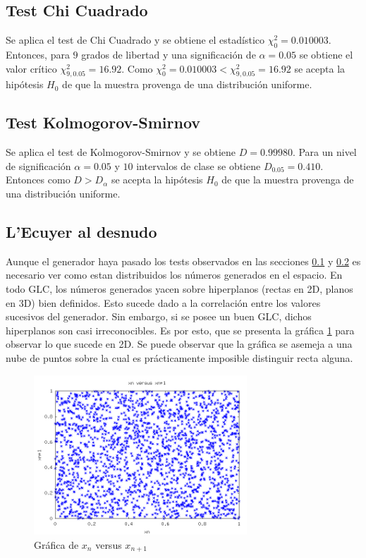 \documentclass{sig-alternate}
\begin{document}
\subsection{Test Chi Cuadrado}
\label{sec:chi}
Se aplica el test de Chi Cuadrado y se obtiene el estad\'istico $\chi_{0}^{2}=0.010003$.
Entonces, para $9$ grados de libertad y una significaci\'on de $\alpha=0.05$ se obtiene
el valor cr\'itico $\chi_{9,0.05}^{2}=16.92$.
Como $\chi_{0}^{2}=0.010003 < \chi_{9,0.05}^{2}=16.92$ se acepta la hip\'otesis $H_{0}$
de que la muestra provenga de una distribuci\'on uniforme.

\subsection{Test Kolmogorov-Smirnov}
\label{sec:kolmogorov}
Se aplica el test de Kolmogorov-Smirnov y se obtiene $D=0.99980$.
Para un nivel de significaci\'on $\alpha=0.05$ y $10$ intervalos de clase
se obtiene $D_{0.05}=0.410$. Entonces como $D > D_{\alpha}$
se acepta la hip\'otesis $H_{0}$ de que la muestra
provenga de una distribuci\'on uniforme.

\subsection{L'Ecuyer al desnudo}
Aunque el generador haya pasado los tests observados en las secciones \ref{sec:chi} y \ref{sec:kolmogorov}
es necesario ver como estan distribuidos los n\'umeros generados en el espacio. En todo GLC,
los n\'umeros generados yacen sobre hiperplanos (rectas en 2D, planos en 3D) bien definidos. Esto
sucede dado a la correlaci\'on entre los valores sucesivos del generador.
Sin embargo, si se posee un buen GLC, dichos hiperplanos son casi irreconocibles. Es por esto,
que se presenta la gr\'afica \ref{fig:ecuyer_2D} para observar lo que sucede en 2D.
Se puede observar que la gr\'afica se asemeja a una nube de puntos sobre la cual es
pr\'acticamente imposible distinguir recta alguna. \\


\begin{figure}[ht]
\label{fig:ecuyer_2D}
\includegraphics[width=8cm]{ecuyer2D}
\caption{Gr\'afica de $x_{n}$ versus $x_{n+1}$}
\end{figure}
\end{document}
